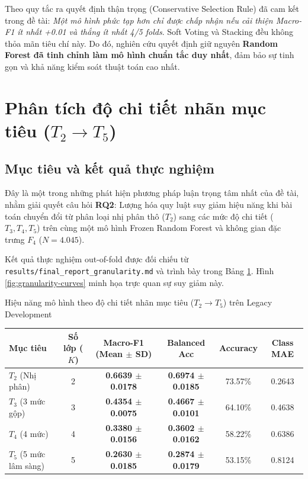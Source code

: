 Theo quy tắc ra quyết định thận trọng (Conservative Selection Rule) đã cam kết trong đề tài: \textit{Một mô hình phức tạp hơn chỉ được chấp nhận nếu cải thiện Macro-F1 ít nhất +0.01 và thắng ít nhất 4/5 folds}. Soft Voting và Stacking đều không thỏa mãn tiêu chí này. Do đó, nghiên cứu quyết định giữ nguyên \textbf{Random Forest đã tinh chỉnh làm mô hình chuẩn tắc duy nhất}, đảm bảo sự tinh gọn và khả năng kiểm soát thuật toán cao nhất.

\section{Phân tích độ chi tiết nhãn mục tiêu ($T_2 \to T_5$)}
\label{sec:target-granularity}

\subsection{Mục tiêu và kết quả thực nghiệm}
Đây là một trong những phát hiện phương pháp luận trọng tâm nhất của đề tài, nhằm giải quyết câu hỏi \textbf{RQ2}: Lượng hóa quy luật suy giảm hiệu năng khi bài toán chuyển đổi từ phân loại nhị phân thô ($T_2$) sang các mức độ chi tiết ($T_3, T_4, T_5$) trên cùng một mô hình Frozen Random Forest và không gian đặc trưng $F_4$ ($N = 4.045$).

Kết quả thực nghiệm out-of-fold được đối chiếu từ \texttt{results/final\_report\_granularity.md} và trình bày trong Bảng \ref{tab:granularity-results}. Hình \ref{fig:granularity-curves} minh họa trực quan sự suy giảm này.

\begin{table}{Hiệu năng mô hình theo độ chi tiết nhãn mục tiêu ($T_2 \to T_5$) trên Legacy Development}
\centering
\label{tab:granularity-results}
\begin{tabular}{l c c c c c}
\toprule
\textbf{Mục tiêu} & \textbf{Số lớp ($K$)} & \textbf{Macro-F1 (Mean $\pm$ SD)} & \textbf{Balanced Acc} & \textbf{Accuracy} & \textbf{Class MAE} \\
\midrule
$T_2$ (Nhị phân)      & 2 & \textbf{0.6639 $\pm$ 0.0178} & \textbf{0.6974 $\pm$ 0.0185} & 73.57\% & 0.2643 \\
$T_3$ (3 mức gộp)     & 3 & \textbf{0.4354 $\pm$ 0.0075} & \textbf{0.4667 $\pm$ 0.0101} & 64.10\% & 0.4638 \\
$T_4$ (4 mức)         & 4 & \textbf{0.3380 $\pm$ 0.0156} & \textbf{0.3602 $\pm$ 0.0162} & 58.22\% & 0.6386 \\
$T_5$ (5 mức lâm sàng)& 5 & \textbf{0.2630 $\pm$ 0.0185} & \textbf{0.2874 $\pm$ 0.0179} & 53.15\% & 0.8124 \\
\bottomrule
\end{tabular}
\end{table}


